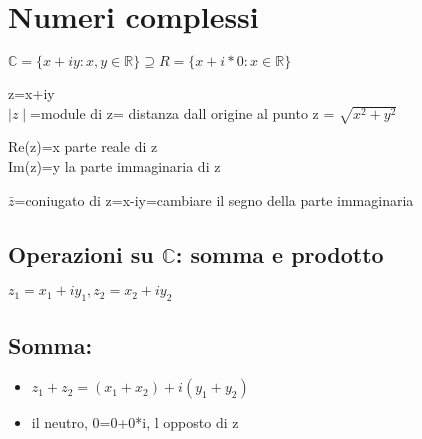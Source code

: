 \documentclass{article}
\begin{document}
          \section{Numeri complessi}
          \begin{flushleft}
            $\mathbb{C}=\{x+iy:x,y\in \mathbb{R}\} \supseteq R=\{x+i*0: x\in \mathbb{R} \}$
          \end{flushleft}
          \begin{flushleft}
            z=x+iy \\
            $\mid z \mid$=module di z= distanza dall origine al punto z = $\sqrt{x^2+y^2}$
          \end{flushleft}
          \begin{flushleft}
            Re(z)=x parte reale di z \\
            Im(z)=y la parte immaginaria di z
          \end{flushleft}
          \begin{flushleft}
            $\bar{z}$=coniugato di z=x-iy=cambiare il segno della parte immaginaria
          \end{flushleft}
          \subsection{Operazioni su $\mathbb{C}$: somma e prodotto}
          \begin{flushleft}
            $z_1=x_1+iy_1,z_2=x_2+iy_2$ 
          \end{flushleft}
          \subsection*{Somma:}
          \begin{itemize}
            \item $z_1+z_2=(x_1+x_2)+i(y_1+y_2)$
            \item il neutro, 0=0+0*i, l opposto di z
          \end{itemize}
\end{document}
